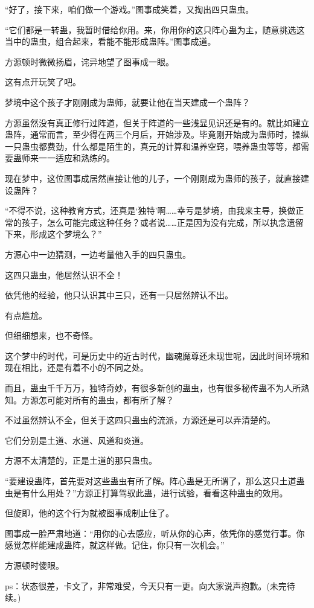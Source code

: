\begin{this_body}
“好了，接下来，咱们做一个游戏。”图事成笑着，又掏出四只蛊虫。

“它们都是一转蛊，我暂时借给你用。来，你用你的这只阵心蛊为主，随意挑选这当中的蛊虫，组合起来，看能不能形成蛊阵。”图事成道。

方源顿时微微扬眉，诧异地望了图事成一眼。

这有点开玩笑了吧。

梦境中这个孩子才刚刚成为蛊师，就要让他在当天建成一个蛊阵？

方源虽然没有真正修行过阵道，但关于阵道的一些浅显见识还是有的。就比如建立蛊阵，通常而言，至少得在两三个月后，开始涉及。毕竟刚开始成为蛊师时，操纵一只蛊虫都费劲，什么都是陌生的，真元的计算和温养空窍，喂养蛊虫等等，都需要蛊师来一一适应和熟练的。

现在梦中，这位图事成居然直接让他的儿子，一个刚刚成为蛊师的孩子，就直接建设蛊阵？

“不得不说，这种教育方式，还真是‘独特’啊……幸亏是梦境，由我来主导，换做正常的孩子，怎么可能完成这种任务？或者说……正是因为没有完成，所以执念遗留下来，形成这个梦境么？”

方源心中一边猜测，一边考量他入手的四只蛊虫。

这四只蛊虫，他居然认识不全！

依凭他的经验，他只认识其中三只，还有一只居然辨认不出。

有点尴尬。

但细细想来，也不奇怪。

这个梦中的时代，可是历史中的近古时代，幽魂魔尊还未现世呢，因此时间环境和现在相比，还是有着不小的不同之处。

而且，蛊虫千千万万，独特奇妙，有很多新创的蛊虫，也有很多秘传蛊不为人所熟知。方源怎可能对所有的蛊虫，都有所了解？

不过虽然辨认不全，但关于这四只蛊虫的流派，方源还是可以弄清楚的。

它们分别是土道、水道、风道和炎道。

方源不太清楚的，正是土道的那只蛊虫。

“要建设蛊阵，首先要对这些蛊虫有所了解。阵心蛊是无所谓了，那么这只土道蛊虫是有什么用处？”方源正打算驾驭此蛊，进行试验，看看这种蛊虫的效用。

但旋即，他的这个行为就被图事成制止住了。

图事成一脸严肃地道：“用你的心去感应，听从你的心声，依凭你的感觉行事。你感觉怎样能建成蛊阵，就这样做。记住，你只有一次机会。”

方源顿时傻眼。

ps：状态很差，卡文了，非常难受，今天只有一更。向大家说声抱歉。(未完待续。)

\end{this_body}

